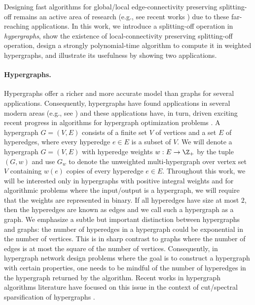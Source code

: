 Designing fast algorithms for global/local edge-connectivity preserving splitting-off remains an active area of research (e.g., see recent works \cite{LY13, CLP22-soda, CLP22-stoc, CHLP23}) due to these far-reaching applications. 
In this work, we introduce a splitting-off operation in \emph{hypergraphs}, show the existence of local-connectivity preserving splitting-off operation, design a strongly polynomial-time algorithm to compute it in weighted hypergraphs, and illustrate its usefulness by showing two applications. 

\paragraph{Hypergraphs.}
Hypergraphs offer a richer and more accurate model than graphs for several applications. 
Consequently, hypergraphs have found applications in several modern areas (e.g., see \cite{VeldtBK22,Schlagetal23,LiM17, Ornes21}) and these applications have, in turn, driven exciting recent progress in algorithms for hypergraph optimization problems \cite{KK15, GKP17, CXY19-j, CX18, CC22, CKN20, SY19, BST19, KKTY21-FOCS, KKTY21-STOC, Lee22, JLS22, Quanrud22, GLSTW22, CC23, AGL23, FPZ23}. 
A hypergraph $G=(V, E)$ consists of a finite set $V$ of vertices and a set $E$ of hyperedges, where every hyperedge $e\in E$ is a subset of $V$. We will denote a hypergraph $G=(V, E)$ with hyperedge weights $w: E\rightarrow \Z_+$ by the tuple $(G, w)$ and use $G_w$ to denote the unweighted multi-hypergraph over vertex set $V$ containing $w(e)$ copies of every hyperedge $e\in E$.  
Throughout this work, we will be interested only in hypergraphs with positive integral weights and for algorithmic problems where the input/output is a hypergraph, we will require that the weights are represented in binary. 
If all hyperedges have size at most $2$, then the hyperedges are known as edges and we call such a hypergraph as a graph. 
We emphasize a subtle but important distinction between hypergraphs and graphs: the number of hyperedges in a hypergraph could be exponential in the number of vertices. This is in sharp contrast to graphs where the number of edges is at most the square of the number of vertices. Consequently, in hypergraph network design problems where the goal is to construct a hypergraph with certain properties,  
one needs to be mindful of the number of hyperedges in the hypergraph returned by the algorithm. %
Recent works in hypergraph algorithms literature have 
focused on this 
issue in the context of cut/spectral sparsification of hypergraphs \cite{KK15, CX18, SY19, BST19, CKN20, KKTY21-FOCS, KKTY21-STOC, Lee22, JLS22, Quanrud22}. 



